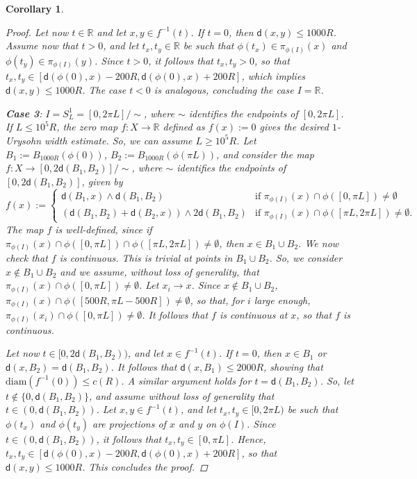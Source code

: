 \documentclass[10pt]{article}
\newtheorem{corollary}[thm]{Corollary}
\theoremstyle{definition}
\newcommand{\bb}[1]{\mathbb{#1}}
\newcommand{\sd}{\mathsf{d}}
\begin{document}
\begin{corollary}
\begin{proof}
        Let now $t \in \bb{R}$ and let $x,y \in f^{-1}(t)$. If $t=0$, then $\sd(x,y) \leq 1000R$. Assume now that $t > 0$, and let 
        $t_x,t_y \in \bb{R}$ be such that $\phi(t_x) \in \pi_{\phi(I)}(x)$ and $\phi(t_y) \in \pi_{\phi(I)}(y)$. Since $t>0$, it follows that $t_x,t_y >0$, so that $t_x,t_y \in [\sd(\phi(0),x)-200R,\sd(\phi(0),x)+200R]$, which implies $\sd(x,y) \leq 1000R$. The case $t<0$ is analogous, concluding the case $I=\bb{R}$.

        \textbf{Case 3}: $I=S^1_L=[0,2\pi L]/\sim$, where $\sim$ identifies the endpoints of $[0,2\pi L]$. 
        \\If $L \leq 10^5R$, the zero map $f:X \to \bb{R}$ defined as $f(x):=0$ gives the desired $1$-Urysohn width estimate. So, we can assume $L \geq 10^5R$.
        Let $B_1:=B_{1000R}(\phi(0))$, $B_2:=B_{1000R}(\phi(\pi L))$, and consider the map $f:X \to [0,2\sd(B_1,B_2)]/\sim$, where $\sim$ identifies the endpoints of $[0,2 \sd(B_1,B_2)]$, given by
        \[
        f(x):=
        \begin{cases}
    \sd(B_1,x) \wedge \sd(B_1,B_2)  & \text{if } \pi_{\phi(I)}(x) \cap  \phi([0,\pi L]) \neq \emptyset \\
            (\sd(B_1,B_2)+\sd(B_2,x)) \wedge  2\sd(B_1,B_2)  & \text{if } \pi_{\phi(I)}(x) \cap  \phi([\pi L,2\pi L]) \neq \emptyset.
         \end{cases}
        \]
        The map $f$ is well-defined, since if $\pi_{\phi(I)}(x) \cap \phi([0,\pi L]) \cap \phi([\pi L,2\pi L]) \neq \emptyset$, then $x \in B_1 \cup B_2$. We now check that $f$ is continuous. This is trivial at points in $B_1 \cup B_2$. So, we consider $x \notin B_1 \cup B_2$ and we assume, without loss of generality, that $\pi_{\phi(I)}(x) \cap \phi([0,\pi L]) \neq \emptyset$. Let $x_i \to x$. Since $x \notin B_1 \cup B_2$, $\pi_{\phi(I)}(x) \cap \phi([500R,\pi L-500R]) \neq \emptyset$, so that, for $i$ large enough, $\pi_{\phi(I)}(x_i) \cap \phi([0,\pi L]) \neq \emptyset$. It follows that $f$ is continuous at $x$, so that $f$ is continuous.

        Let now $t \in [0,2\sd(B_1,B_2))$, and let $x \in f^{-1}(t)$. If $t=0$, then $x \in B_1$ or $\sd(x,B_2)=\sd(B_1,B_2)$. It follows that $\sd(x,B_1) \leq 2000R$, showing that $\mathrm{diam}(f^{-1}(0)) \leq c(R)$. A similar argument holds for $t=\sd(B_1,B_2)$. So, let $t \notin \{0,\sd(B_1,B_2)\}$, and assume without loss of generality that $t \in (0,\sd(B_1,B_2))$.
        Let $x,y \in f^{-1}(t)$, and let 
        $t_x,t_y \in [0,2\pi L)$ be such that $\phi(t_x)$ and $\phi(t_y)$ are projections of $x$ and $y$ on $\phi(I)$. Since $t \in (0,\sd(B_1,B_2))$, it follows that $t_x,t_y \in [0,\pi L]$. Hence, $t_x,t_y \in [\sd(\phi(0),x)-200R,\sd(\phi(0),x)+200R]$, 
        so that $\sd(x,y) \leq 1000R$. This concludes the proof.
    \end{proof}
\end{corollary}
\end{document}
